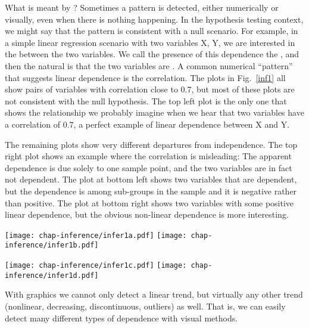 What is meant by ?  Sometimes a pattern is
detected, either numerically or visually, even when there is nothing
happening. In the hypothesis testing context, we might say that the
pattern is consistent with a null scenario.  For example, in a simple
linear regression scenario with two variables X, Y, we are interested
in the  between the two variables.  We call the
presence of this dependence the , and then
the natural   is that the two variables are .  A
common numerical ``pattern'' that suggests linear dependence is the
correlation.  The plots in Fig.~\ref{inf1} all show pairs of
variables with correlation close to 0.7, but most of these plots are
not consistent with the null hypothesis.  The top left plot is the
only one that shows the relationship we probably imagine when we hear
that two variables have a correlation of 0.7, a perfect example of
linear dependence between X and Y.

The remaining plots show very different departures from independence.
The top right plot shows an example where the correlation is
misleading: The apparent dependence is due solely to one sample point,
and the two variables are in fact not dependent. The plot at bottom
left shows two variables that are dependent, but the dependence is
among sub-groups in the sample and it is negative rather than
positive. The plot at bottom right shows two variables with some
positive linear dependence, but the obvious non-linear dependence is
more interesting.

\begin{figure*}[htp]
\centerline{{\texttt{[image: chap-inference/infer1a.pdf]}}
  {\texttt{[image: chap-inference/infer1b.pdf]}}}
  \centerline{{\texttt{[image: chap-inference/infer1c.pdf]}}
  {\texttt{[image: chap-inference/infer1d.pdf]}}}
\caption[Comparison of various pairwise relationships with the same
correlation]{Studying dependence between X and Y. All four pairs of
variables have correlation approximately equal to 0.7, but they all
have very different patterns. Only the top left plot shows two
variables matching a dependence modeled by correlation. }
\label{inf1}
\end{figure*}

With graphics we cannot only detect a linear trend, but virtually any
other trend (nonlinear, decreasing, discontinuous, outliers) as
well. That is, we can easily detect many different types of dependence with
visual methods.

